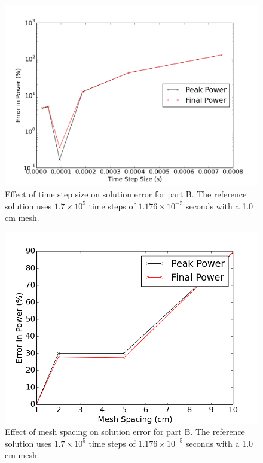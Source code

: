 \documentclass[12pt]{report}
\begin{document}
	\begin{figure}[ht]
		\centering
		\includegraphics[width=.7\linewidth]{figs/partB_timeStep.png}
		\caption{Effect of time step size on solution error for part B. The reference solution uses $1.7\times10^5$ time steps of  $1.176 \times 10^{-5}$ seconds with a 1.0 cm mesh.}
		\label{fig::partB_timestep}
	\end{figure}

	\begin{figure}[ht]
		\centering
		\includegraphics[width=.7\linewidth]{figs/partB_spatial.png}
		\caption{Effect of mesh spacing on solution error for part B. The reference solution uses $1.7\times10^5$ time steps of $1.176 \times 10^{-5}$ seconds with a 1.0 cm mesh.}
		\label{fig::partB_spatial}
	\end{figure}
\end{document}
